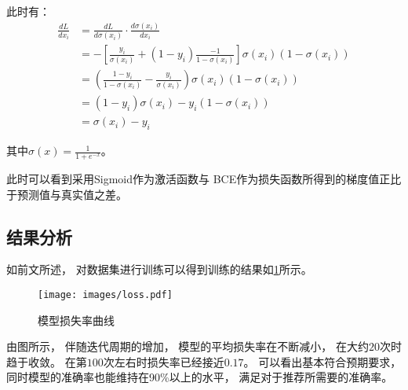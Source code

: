 此时有：
\begin{equation}
	\begin{aligned}
		\frac{d L}{d x_{i}} & =\frac{d L}{d \sigma\left(x_{i}\right)} \cdot \frac{d \sigma\left(x_{i}\right)}{d x_{i}}                                                                                         \\
		                    & =-\left[\frac{y_{i}}{\sigma\left(x_{i}\right)}+\left(1-y_{i}\right) \frac{-1}{1-\sigma\left(x_{i}\right)}\right] \sigma\left(x_{i}\right)\left(1-\sigma\left(x_{i}\right)\right) \\
		                    & =\left(\frac{1-y_{i}}{1-\sigma\left(x_{i}\right)}-\frac{y_{i}}{\sigma\left(x_{i}\right)}\right) \sigma\left(x_{i}\right)\left(1-\sigma\left(x_{i}\right)\right)                  \\
		                    & =\left(1-y_{i}\right) \sigma\left(x_{i}\right)-y_{i}\left(1-\sigma\left(x_{i}\right)\right)                                                                                      \\
		                    & =\sigma\left(x_{i}\right)-y_{i}
	\end{aligned}
\end{equation}

其中$ \sigma(x)=\frac{1}{1+e^{-x}} $。

此时可以看到采用Sigmoid作为激活函数与
BCE作为损失函数所得到的梯度值正比于预测值与真实值之差。

\subsection{结果分析}

如前文所述，
对数据集进行训练可以得到训练的结果如\cref{fig:loss}所示。

\begin{figure}[!htbp]
	\centering
	\texttt{[image: images/loss.pdf]}
	\caption{模型损失率曲线}\label{fig:loss}
\end{figure}

由图所示，
伴随迭代周期的增加，
模型的平均损失率在不断减小，
在大约$20$次时趋于收敛。
在第$100$次左右时损失率已经接近$0.17$。
可以看出基本符合预期要求，
同时模型的准确率也能维持在90\%以上的水平，
满足对于推荐所需要的准确率。